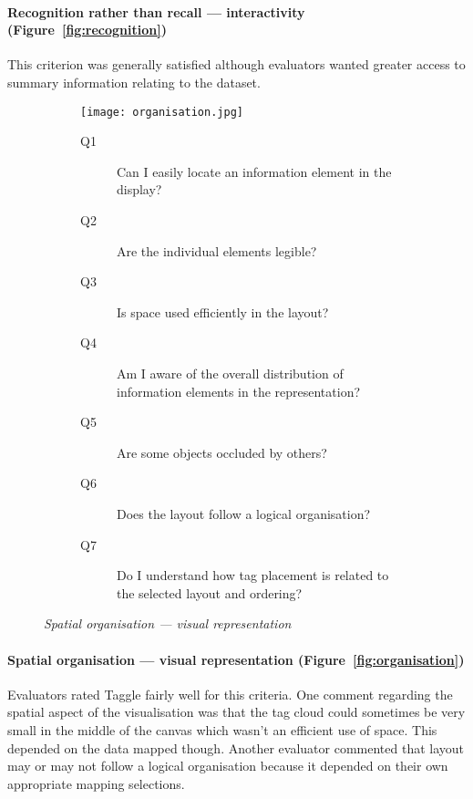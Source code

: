\paragraph{Recognition rather than recall --- interactivity (Figure~\vref{fig:recognition})}

This criterion was generally satisfied although evaluators wanted greater access to summary information relating to the dataset.

\begin{figure}[!htb]
\centering
\begin{subfigure}{\textwidth}
	\centering
	\texttt{[image: organisation.jpg]}
\end{subfigure}
\begin{subfigure}{\textwidth}
  \begin{description}
	\item[Q1]Can I easily locate an information element in the display?
	\item[Q2]Are the individual elements legible?
	\item[Q3]Is space used efficiently in the layout?
	\item[Q4]Am I aware of the overall distribution of information elements in the representation?
	\item[Q5]Are some objects occluded by others?
	\item[Q6]Does the layout follow a logical organisation?
	\item[Q7]Do I understand how tag placement is related to the selected layout and ordering? 
  \end{description}
\end{subfigure}
\caption{\textit{Spatial organisation --- visual representation}}
\label{fig:organisation}
\end{figure}

\paragraph{Spatial organisation --- visual representation (Figure~\vref{fig:organisation})}

Evaluators rated Taggle fairly well for this criteria. One comment regarding the spatial aspect of the visualisation was that the tag cloud could sometimes be very small in the middle of the canvas which wasn't an efficient use of space. This depended on the data mapped though. Another evaluator commented that layout may or may not follow a logical organisation because it depended on their own appropriate mapping selections.

